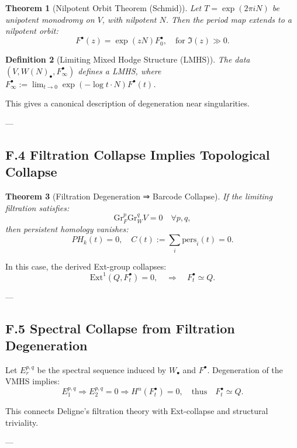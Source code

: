 \documentclass[11pt]{article}
\newtheorem{theorem}{Theorem}[section]
\newtheorem{definition}[theorem]{Definition}
\begin{document}
\begin{theorem}[Nilpotent Orbit Theorem (Schmid)]
Let $T = \exp(2\pi i N)$ be unipotent monodromy on $V$, with nilpotent $N$. Then the period map extends to a nilpotent orbit:
\[
F^\bullet(z) = \exp(z N) F^\bullet_0,
\quad \text{for } \Im(z) \gg 0.
\]
\end{theorem}

\begin{definition}[Limiting Mixed Hodge Structure (LMHS)]
The data $(V, W(N)_\bullet, F^\bullet_\infty)$ defines a LMHS,  
where $F^\bullet_\infty := \lim_{t \to 0} \exp(-\log t \cdot N) F^\bullet(t)$.
\end{definition}

This gives a canonical description of degeneration near singularities.

---

\subsection*{F.4 Filtration Collapse Implies Topological Collapse}

\begin{theorem}[Filtration Degeneration ⇒ Barcode Collapse]
If the limiting filtration satisfies:
\[
\mathrm{Gr}_F^p \mathrm{Gr}_W^q V = 0 \quad \forall p,q,
\]
then persistent homology vanishes:
\[
PH_k(t) = 0, \quad C(t) := \sum_i \text{pers}_i(t) = 0.
\]
\end{theorem}

\begin{corollary}
In this case, the derived Ext-group collapses:
\[
\mathrm{Ext}^1(Q, F^\bullet_t) = 0,
\quad \Rightarrow \quad
F^\bullet_t \simeq Q.
\]
\end{corollary}

---

\subsection*{F.5 Spectral Collapse from Filtration Degeneration}

Let $E_r^{p,q}$ be the spectral sequence induced by $W_\bullet$ and $F^\bullet$.  
Degeneration of the VMHS implies:
\[
E_1^{p,q} \Rightarrow E_2^{p,q} = 0 \Rightarrow H^n(F^\bullet_t) = 0,
\quad \text{thus} \quad F^\bullet_t \simeq Q.
\]

This connects Deligne’s filtration theory with Ext-collapse and structural triviality.

---
\end{document}
